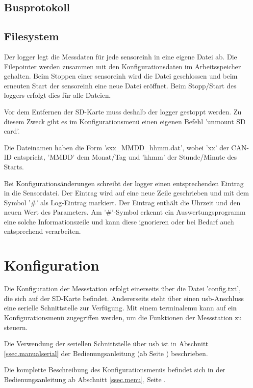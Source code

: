 
\subsection{Busprotokoll}\label{subsec.sw_busprotokoll}

\subsection{Filesystem}\label{subsec.sw_filesystem}
Der \gls{logger} legt die Messdaten für jede \gls{sensoreinh} in eine eigene Datei ab. Die Filepointer werden zusammen mit den Konfigurationsdaten im Arbeitsspeicher gehalten. Beim Stoppen einer \gls{sensoreinh} wird die Datei geschlossen und beim erneuten Start der \gls{sensoreinh} eine neue Datei eröffnet. Beim Stopp/Start des \gls{logger}s erfolgt dies für alle Dateien.

Vor dem Entfernen der SD-Karte muss deshalb der \gls{logger} gestoppt werden. Zu diesem Zweck gibt es im Konfigurationsmenü einen eigenen Befehl 'unmount SD card'.

Die Dateinamen haben die Form 'sxx\_MMDD\_hhmm.dat', wobei 'xx' der CAN-ID entspricht, 'MMDD' dem Monat/Tag und 'hhmm' der Stunde/Minute des Starts.

Bei Konfigurationsänderungen schreibt der \gls{logger} einen entsprechenden Eintrag in die Sensordatei. Der Eintrag wird auf eine neue Zeile geschrieben und mit dem Symbol '\#' als Log-Eintrag markiert. Der Eintrag enthält die Uhrzeit und den neuen Wert des Parameters. Am '\#'-Symbol erkennt ein Auswertungsprogramm eine solche Informationszeile und kann diese ignorieren oder bei Bedarf auch entsprechend verarbeiten.



\section{Konfiguration}\label{sec.sw_konfiguration}
Die Konfiguration der Messstation erfolgt einerseits über die Datei 'config.txt', die sich auf der SD-Karte befindet. Andererseits steht über einen \gls{usb}-Anschluss eine serielle Schnittstelle zur Verfügung. Mit einem \gls{terminalemu} kann auf ein Konfigurationsmenü zugegriffen werden, um die Funktionen der Messstation zu steuern.

Die Verwendung der seriellen Schnittstelle über \gls{usb} ist in Abschnitt \ref{ssec.manualserial} der Bedienungsanleitung (ab Seite \pageref{ssec.manualserial}) beschrieben.

Die komplette Beschreibung des Konfigurationsmenüs befindet sich in der Bedienungsanleitung ab Abschnitt \ref{ssec.menu}, Seite \pageref{ssec.menu}.
